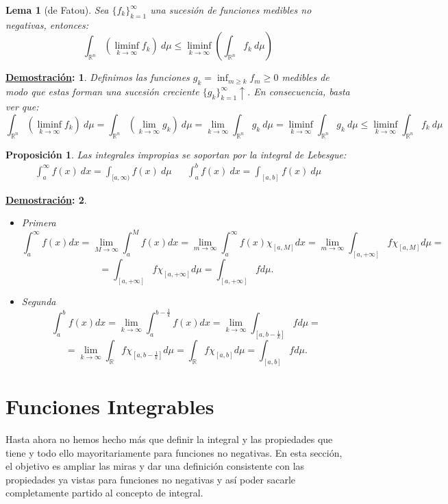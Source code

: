 \documentclass[10pt,a4paper,openright]{book}
\theoremstyle{break}
\newtheorem*{lema}{Lema}
\newtheorem*{prop}{Proposición}
\newtheorem*{demo}{\underline{Demostración}:}
\newcommand{\dif}[1]{\ d#1}
\begin{document}
\begin{lema}[de Fatou]
Sea $\{f_k\}_{k=1}^{\infty}$ una sucesión de funciones medibles no negativas, entonces: 
$$\int_{\mathbb{R}^n} \left( \liminf_{k \rightarrow \infty}f_k \right) \dif{\mu} \le \liminf_{k \rightarrow \infty} \left(\int_{\mathbb{R}^n} f_k \dif{\mu}\right) $$
\end{lema}
\begin{demo}
Definimos las funciones $g_k = \inf_{m \ge k} f_m \ge 0$ medibles de modo que estas forman una sucesión creciente $\{g_k\}_{k=1}^\infty\uparrow$. En consecuencia, basta ver que:
$$\int_{\mathbb{R}^n} \left(\liminf_{k \rightarrow \infty}f_k \right) \dif{\mu} = \int_{\mathbb{R}^n} \left(\lim_{k \rightarrow \infty}g_k \right)\dif{\mu} =  \lim_{k \rightarrow \infty} \int_{\mathbb{R}^n} g_k \dif{\mu} = \liminf_{k \rightarrow \infty}\int_{\mathbb{R}^n} g_k \dif{\mu} \le \liminf_{k \rightarrow \infty} \int_{\mathbb{R}^n} f_k \dif{\mu}$$
\end{demo}

\begin{prop}
Las integrales impropias se soportan por la integral de Lebesgue:
\begin{align*}
\int_a^\infty f(x) \dif{x} = \int_{[a, \infty)}f(x)\dif{\mu} & &\int_a^b f(x)\dif{x} = \int_{[a,b]} f(x) \dif{\mu}
\end{align*}
\end{prop}
\begin{demo}
\begin{itemize}
\item Primera
$$\int_a^{\infty} f \left(x\right) dx = \lim_{M \rightarrow \infty} \int_a^M f \left(x\right) dx = \lim_{m \rightarrow \infty} \int_a^{\infty} f \left(x\right) \chi_{\left[a, M\right]}dx = \lim_{m \rightarrow \infty} \int_{\left[a, +\infty\right]} f \chi_{\left[a, M\right]} d \mu =$$
$$= \int_{\left[a, +\infty\right]} f \chi_{\left[a, +\infty\right]} d \mu = \int_{\left[a, +\infty\right]} f d \mu. $$
\item Segunda
$$\int_a^b f \left(x\right) dx = \lim_{k \rightarrow \infty}\int_a^{b - \frac{1}{k}} f \left(x\right) dx = \lim_{k \rightarrow \infty} \int_{\left[a, b - \frac{1}{k}\right]} f d \mu =$$
$$= \lim_{k \rightarrow \infty} \int_{\mathbb{R}} f \chi_{\left[a, b - \frac{1}{k}\right]} d \mu = \int_{\mathbb{R}} f \chi_{\left[a, b\right]} d \mu = \int_{\left[a, b\right]} f d \mu.$$
\end{itemize}
\end{demo}

\section{Funciones Integrables}
Hasta ahora no hemos hecho más que definir la integral y las propiedades que tiene y todo ello mayoritariamente para funciones no negativas. En esta sección, el objetivo es ampliar las miras y dar una definición consistente con las propiedades ya vistas para funciones no negativas y así poder sacarle completamente partido al concepto de integral.
\end{document}
